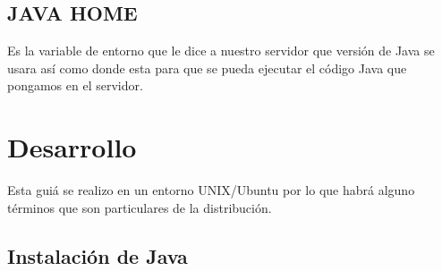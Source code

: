 \documentclass{article}
\begin{document}
		\subsection{JAVA HOME}
			Es la variable de entorno que le dice a nuestro servidor que versión de Java se usara así como donde esta para que se pueda ejecutar el código Java que pongamos en el servidor.
	\section{Desarrollo}
		Esta guiá se realizo en un entorno UNIX/Ubuntu por lo que habrá alguno términos que son particulares de la distribución.
		\subsection{Instalación de Java}
		
\end{document}
